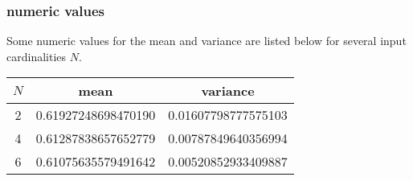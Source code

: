 \subsubsection{numeric values}
Some numeric values for the mean and variance are listed below for several input cardinalities $N$.
\begin{table}[h!]
\centering
\begin{tabular}{c|c|c}
$N$ & mean & variance \\ \hline
2 & 0.61927248698470190 & 0.01607798777575103 \\
4 & 0.61287838657652779 & 0.00787849640356994 \\
6 & 0.61075635579491642 & 0.00520852933409887
\end{tabular}
\end{table}
